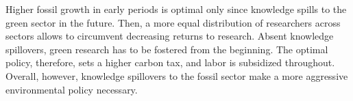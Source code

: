  Higher fossil growth in early periods is optimal only since knowledge spills to the green sector in the future. Then, a more equal distribution of researchers across sectors allows to circumvent decreasing returns to research. Absent knowledge spillovers, green research has to be fostered from the beginning. The optimal policy, therefore, sets a higher carbon tax, and labor is subsidized throughout. Overall, however, knowledge spillovers to the fossil sector make a more aggressive environmental policy necessary. 
 
 
\clearpage

